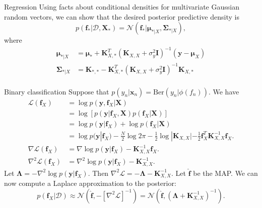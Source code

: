\documentclass{beamer}
\begin{document}
\begin{frame}{Regression}
    Using facts about conditional densities for multivariate Gaussian random vectors, we can show that the desired posterior predictive density is
    \[
    p(\boldsymbol{f}_* | \mathcal{D}, \boldsymbol{X}_*) = \mathcal{N}(\boldsymbol{f}_* | \boldsymbol{\mu}_{* | X}, \boldsymbol{\Sigma}_{* | X}),
    \]
    where
    \begin{align*}
        \boldsymbol{\mu}_{* | X} &= \boldsymbol{\mu}_* + \boldsymbol{K}_{X, *}^T(\boldsymbol{K}_{X, X} + \sigma_y^2 \boldsymbol{I})^{-1}(\boldsymbol{y} - \boldsymbol{\mu}_X) \\
        \boldsymbol{\Sigma}_{* | X} &= \boldsymbol{K}_{*, *} - \boldsymbol{K}_{X, *}^T(\boldsymbol{K}_{X, X} + \sigma_y^2 \boldsymbol{I})^{-1}\boldsymbol{K}_{X, *}\\
    \end{align*}
\end{frame}

\begin{frame}{Binary classification}
    Suppose that $p(y_n | \boldsymbol{x}_n) = \text{Ber}(y_n | \phi(f_n))$. We have
    \begin{align*}
        \mathcal{L}(\boldsymbol{f}_X) &= \log p(\boldsymbol{y}, \boldsymbol{f}_X | \boldsymbol{X}) \\
        &= \log[p(\boldsymbol{y} | \boldsymbol{f}_X, \boldsymbol{X})p(\boldsymbol{f}_X | \boldsymbol{X})] \\
        &= \log p(\boldsymbol{y} | \boldsymbol{f}_X) + \log p(\boldsymbol{f}_X | \boldsymbol{X}) \\
        &= \log p(\boldsymbol{y} | \boldsymbol{f}_X) -\frac{N}{2}\log 2\pi - \frac{1}{2}\log|\boldsymbol{K}_{X, X}| - \frac{1}{2}\boldsymbol{f}_X^T\boldsymbol{K}_{X, X}^{-1}\boldsymbol{f}_X. \\
        \nabla\mathcal{L}(\boldsymbol{f}_X) &= \nabla\log p(\boldsymbol{y} | \boldsymbol{f}_X) - \boldsymbol{K}_{X, X}^{-1}\boldsymbol{f}_X. \\
        \nabla^2 \mathcal{L}(\boldsymbol{f}_X) &= \nabla^2 \log p(\boldsymbol{y} | \boldsymbol{f}_X) - \boldsymbol{K}_{X, X}^{-1}.
    \end{align*}
    Let $\boldsymbol{\Lambda} = -\nabla^2 \log p(\boldsymbol{y} | \boldsymbol{f}_X)$. Then $\nabla^2 \mathcal{L} = -\boldsymbol{\Lambda} - \boldsymbol{K}_{X, X}^{-1}$. Let $\hat{\boldsymbol{f}}$ be the MAP. We can now compute a Laplace approximation to the posterior:
    \[
    p(\boldsymbol{f}_X | \mathcal{D}) \approx \mathcal{N}(\hat{\boldsymbol{f}}, -[\nabla^2 \mathcal{L}]^{-1}) = \mathcal{N}(\hat{\boldsymbol{f}}, (\boldsymbol{\Lambda} + \boldsymbol{K}_{X, X}^{-1})^{-1}).
    \]
\end{frame}
\end{document}
